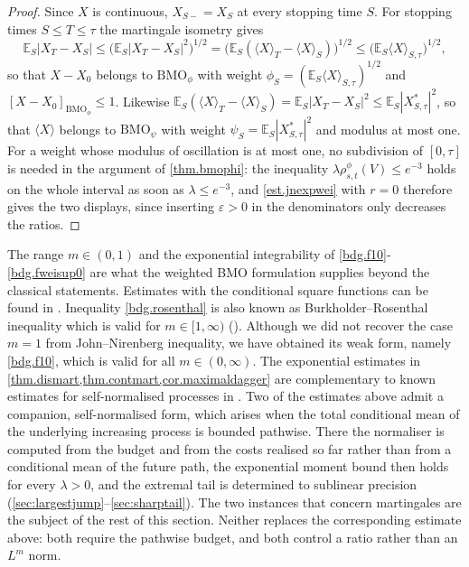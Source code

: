 \documentclass[12pt,oneside,reqno,fleqn]{amsart}
\numberwithin{equation}{section}
\theoremstyle{remark}
\newcommand\mE{{\mathbb E}}
\newcommand\E{\mE}
\newcommand{\1}{{\mathbf 1}}
\newcommand{\wei}[1]{\langle#1\rangle}
\renewcommand{\le}{\leq}
\newcommand{\bmo}{{\mathrm{BMO}}}
\begin{document}
	\begin{proof}
		Since $X$ is continuous, $X_{S-}=X_S$ at every stopping time $S$. For stopping times $S\le T\le\tau$ the martingale isometry gives
		\[
			\E_S|X_T-X_S|\le\big(\E_S|X_T-X_S|^2\big)^{1/2}=\big(\E_S(\wei{X}_T-\wei{X}_S)\big)^{1/2}\le\big(\E_S\wei{X}_{S,\tau}\big)^{1/2},
		\]
		so that $X-X_0$ belongs to $\bmo_\phi$ with weight $\phi_S=(\E_S\wei{X}_{S,\tau})^{1/2}$ and $[X-X_0]_{\bmo_\phi}\le1$. Likewise $\E_S(\wei{X}_T-\wei{X}_S)=\E_S|X_T-X_S|^2\le\E_S|X^*_{S,\tau}|^2$, so that $\wei{X}$ belongs to $\bmo_\psi$ with weight $\psi_S=\E_S|X^*_{S,\tau}|^2$ and modulus at most one. For a weight whose modulus of oscillation is at most one, no subdivision of $[0,\tau]$ is needed in the argument of \cref{thm.bmophi}: the inequality $\lambda\rho^\phi_{s,t}(V)\le e^{-3}$ holds on the whole interval as soon as $\lambda\le e^{-3}$, and \eqref{est.jnexpwei} with $r=0$ therefore gives the two displays, since inserting $\varepsilon>0$ in the denominators only decreases the ratios.
	\end{proof}
	The range $m\in(0,1)$ and the exponential integrability of \eqref{bdg.f10}-\eqref{bdg.fweisup0} are what the weighted BMO formulation supplies beyond the classical statements. Estimates with the conditional square functions can be found in \cite{MR0448538,MR365692,MR1127721}. 
	Inequality \eqref{bdg.rosenthal} is also known as Burkholder--Rosenthal inequality which is valid for $m\in[1,\infty)$ (\cite{MR365692}). Although we did not recover the case $m=1$ from John--Nirenberg inequality, we have obtained its weak form, namely \eqref{bdg.f10}, which is valid for all $m\in(0,\infty)$.
	The exponential estimates in \cref{thm.dismart,thm.contmart,cor.maximaldagger} are complementary to known estimates for self-normalised processes in \cite[Chapter 12]{MR2488094}. 
	Two of the estimates above admit a companion, self-normalised form, which arises when the total conditional mean of the underlying increasing process is bounded pathwise. There the normaliser is computed from the budget and from the costs realised so far rather than from a conditional mean of the future path, the exponential moment bound then holds for every $\lambda>0$, and the extremal tail is determined to sublinear precision (\cref{sec:largestjump}--\cref{sec:sharptail}). The two instances that concern martingales are the subject of the rest of this section. Neither replaces the corresponding estimate above: both require the pathwise budget, and both control a ratio rather than an $L^m$ norm.
\end{document}
